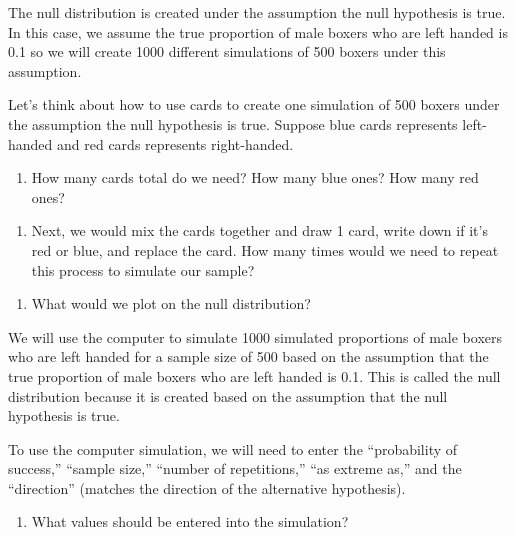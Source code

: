 \documentclass[
]{report}
\providecommand{\tightlist}{%
  \setlength{\itemsep}{0pt}\setlength{\parskip}{0pt}}
\begin{document}
The null distribution is created under the assumption the null hypothesis is true. In this case, we assume the true proportion of male boxers who are left handed is 0.1 so we will create 1000 different simulations of 500 boxers under this assumption.

Let's think about how to use cards to create one simulation of 500 boxers under the assumption the null hypothesis is true. Suppose blue cards represents left-handed and red cards represents right-handed.

\begin{enumerate}
\def\labelenumi{\arabic{enumi}.}
\setcounter{enumi}{14}
\tightlist
\item
  How many cards total do we need? How many blue ones? How many red ones?
\end{enumerate}

\vspace{0.5in}

\begin{enumerate}
\def\labelenumi{\arabic{enumi}.}
\setcounter{enumi}{15}
\tightlist
\item
  Next, we would mix the cards together and draw 1 card, write down if it's red or blue, and replace the card. How many times would we need to repeat this process to simulate our sample?
\end{enumerate}

\vspace{0.5in}

\begin{enumerate}
\def\labelenumi{\arabic{enumi}.}
\setcounter{enumi}{16}
\tightlist
\item
  What would we plot on the null distribution?
  \vspace{1in}
\end{enumerate}

We will use the computer to simulate 1000 simulated proportions of male boxers who are left handed for a sample size of 500 based on the assumption that the true proportion of male boxers who are left handed is 0.1. This is called the null distribution because it is created based on the assumption that the null hypothesis is true.

To use the computer simulation, we will need to enter the ``probability of success,'' ``sample size,'' ``number of repetitions,'' ``as extreme as,'' and the ``direction'' (matches the direction of the alternative hypothesis).

\begin{enumerate}
\def\labelenumi{\arabic{enumi}.}
\setcounter{enumi}{17}
\tightlist
\item
  What values should be entered into the simulation?
\end{enumerate}
\end{document}
